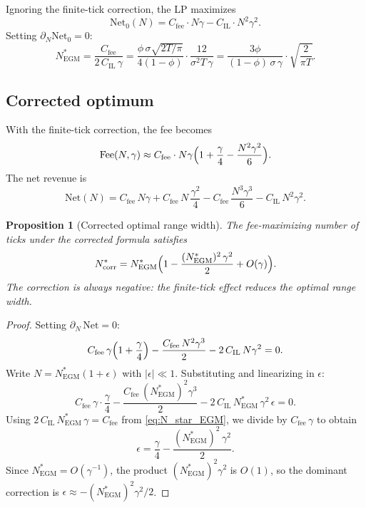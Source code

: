 \documentclass[11pt]{article}
\newtheorem{proposition}[theorem]{Proposition}
\theoremstyle{definition}
\theoremstyle{remark}
\newcommand{\IL}{\mathrm{IL}}
\begin{document}
Ignoring the finite-tick correction, the LP maximizes
\begin{equation}\label{eq:net_uncorrected}
\mathrm{Net}_0(N) = C_{\mathrm{fee}} \cdot N\gamma
- C_{\IL} \cdot N^2\gamma^2.
\end{equation}
Setting $\partial_N \mathrm{Net}_0 = 0$:
\begin{equation}\label{eq:N_star_EGM}
N^*_{\mathrm{EGM}} = \frac{C_{\mathrm{fee}}}{2\,C_{\IL}\,\gamma}
= \frac{\phi\,\sigma\sqrt{2T/\pi}}{4(1-\phi)}
\cdot \frac{12}{\sigma^2 T\,\gamma}
= \frac{3\phi}{(1-\phi)\,\sigma\,\gamma}
\cdot \sqrt{\frac{2}{\pi T}}.
\end{equation}

\subsection{Corrected optimum}

With the finite-tick correction, the fee becomes
\begin{equation}\label{eq:fee_corrected_full}
\mathrm{Fee}(N, \gamma) \approx C_{\mathrm{fee}} \cdot N\gamma
\Bigl(1 + \frac{\gamma}{4} - \frac{N^2\gamma^2}{6}\Bigr).
\end{equation}
The net revenue is
\begin{equation}\label{eq:net_corrected}
\mathrm{Net}(N) = C_{\mathrm{fee}}\,N\gamma
+ C_{\mathrm{fee}}\,N\,\frac{\gamma^2}{4}
- C_{\mathrm{fee}}\,\frac{N^3\gamma^3}{6}
- C_{\IL}\,N^2\gamma^2.
\end{equation}

\begin{proposition}[Corrected optimal range width]
\label{prop:optimal_N}
The fee-maximizing number of ticks under the corrected formula
satisfies
\begin{equation}\label{eq:N_corrected}
N^*_{\mathrm{corr}} = N^*_{\mathrm{EGM}}
\Bigl(1 - \frac{(N^*_{\mathrm{EGM}})^2\,\gamma^2}{2}
+ O(\gamma)\Bigr).
\end{equation}
The correction is always negative: the finite-tick effect reduces the
optimal range width.
\end{proposition}
\begin{proof}
Setting $\partial_N\,\mathrm{Net} = 0$:
\begin{equation}\label{eq:FOC}
C_{\mathrm{fee}}\,\gamma\Bigl(1 + \frac{\gamma}{4}\Bigr)
- \frac{C_{\mathrm{fee}}\,N^2\gamma^3}{2}
- 2\,C_{\IL}\,N\gamma^2 = 0.
\end{equation}
Write $N = N^*_{\mathrm{EGM}}(1 + \epsilon)$ with
$|\epsilon| \ll 1$. Substituting and linearizing in $\epsilon$:
\[
C_{\mathrm{fee}}\,\gamma \cdot \frac{\gamma}{4}
- \frac{C_{\mathrm{fee}}\,(N^*_{\mathrm{EGM}})^2\gamma^3}{2}
- 2\,C_{\IL}\,N^*_{\mathrm{EGM}}\,\gamma^2\,\epsilon = 0.
\]
Using $2\,C_{\IL}\,N^*_{\mathrm{EGM}}\,\gamma =
C_{\mathrm{fee}}$ from \eqref{eq:N_star_EGM}, we divide by
$C_{\mathrm{fee}}\,\gamma$ to obtain
\[
\epsilon = \frac{\gamma}{4}
- \frac{(N^*_{\mathrm{EGM}})^2\,\gamma^2}{2}.
\]
Since $N^*_{\mathrm{EGM}} = O(\gamma^{-1})$, the product
$(N^*_{\mathrm{EGM}})^2\gamma^2$ is $O(1)$, so the dominant
correction is $\epsilon \approx
-(N^*_{\mathrm{EGM}})^2\gamma^2/2$.
\end{proof}
\end{document}
